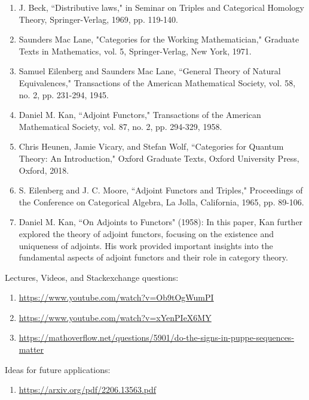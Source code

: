 \documentclass{book}
\theoremstyle{definition}
\begin{document}
{{\begin{enumerate}
\item J. Beck, ``Distributive laws," in Seminar on Triples and Categorical Homology Theory, Springer-Verlag, 1969, pp. 119-140.
\item Saunders Mac Lane, "Categories for the Working Mathematician," Graduate Texts in Mathematics, vol. 5, Springer-Verlag, New York, 1971.
\item Samuel Eilenberg and Saunders Mac Lane, ``General Theory of Natural Equivalences," Transactions of the American Mathematical Society, vol. 58, no. 2, pp. 231-294, 1945.
\item Daniel M. Kan, ``Adjoint Functors," Transactions of the American Mathematical Society, vol. 87, no. 2, pp. 294-329, 1958.
\item Chris Heunen, Jamie Vicary, and Stefan Wolf, ``Categories for Quantum Theory: An Introduction," Oxford Graduate Texts, Oxford University Press, Oxford, 2018.
\item S. Eilenberg and J. C. Moore, ``Adjoint Functors and Triples," Proceedings of the Conference on Categorical Algebra, La Jolla, California, 1965, pp. 89-106.
\item Daniel M. Kan, ``On Adjoints to Functors" (1958): In this paper, Kan further explored the theory of adjoint functors, focusing on the existence and uniqueness of adjoints. His work provided important insights into the fundamental aspects of adjoint functors and their role in category theory.
\end{enumerate}

Lectures, Videos, and Stackexchange questions:

\begin{enumerate}
\item \url{https://www.youtube.com/watch?v=Ob9tOgWumPI}
\item \url{https://www.youtube.com/watch?v=xYenPIeX6MY}
\item \url{https://mathoverflow.net/questions/5901/do-the-signs-in-puppe-sequences-matter}
\end{enumerate}

Ideas for future applications:

\begin{enumerate}
\item \url{https://arxiv.org/pdf/2206.13563.pdf}
\end{enumerate}

}}
\end{document}
